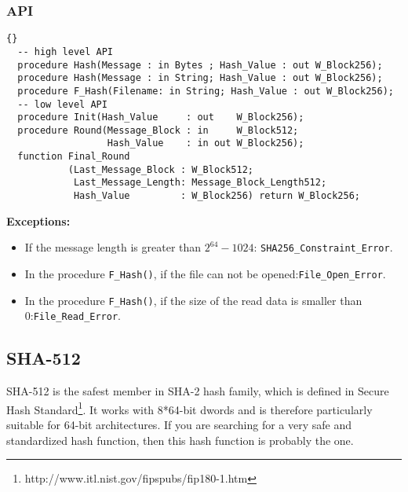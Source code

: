 \subsubsection*{API}
\begin{lstlisting}{}
  -- high level API
  procedure Hash(Message : in Bytes ; Hash_Value : out W_Block256);
  procedure Hash(Message : in String; Hash_Value : out W_Block256);
  procedure F_Hash(Filename: in String; Hash_Value : out W_Block256);
  -- low level API
  procedure Init(Hash_Value     : out    W_Block256);
  procedure Round(Message_Block : in     W_Block512;
                  Hash_Value    : in out W_Block256);
  function Final_Round
           (Last_Message_Block : W_Block512;
            Last_Message_Length: Message_Block_Length512;
            Hash_Value         : W_Block256) return W_Block256;
\end{lstlisting}
\textbf{Exceptions:}
\begin{itemize}
\item If the message length is greater than $2^{64}-1024$:\quad
  \texttt{SHA256\_Constraint\_Error}.
\item In the procedure \texttt{F\_Hash()}, if the file can not be
  opened:\quad\texttt{File\_Open\_Error}.
\item In the procedure \texttt{F\_Hash()}, if the size of the read
  data is smaller than 0:\quad\texttt{File\_Read\_Error}.
\end{itemize}


\subsection{SHA-512}
SHA-512 is the safest member in SHA-2 hash family, which is defined in
Secure Hash
Standard\footnote{http://www.itl.nist.gov/fipspubs/fip180-1.htm}. It
works with 8*64-bit dwords and is therefore particularly suitable for
64-bit architectures. If you are searching for a very safe and
standardized hash function, then this hash function is probably the
one.


